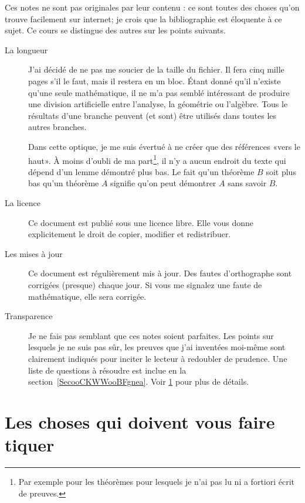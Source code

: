 Ces notes ne sont pas originales par leur contenu : ce sont toutes des choses qu'on trouve facilement sur internet; je crois que la bibliographie est éloquente à ce sujet. Ce cours se distingue des autres sur les points suivants.
\begin{description}
    \item[La longueur] J'ai décidé de ne pas me soucier de la taille du fichier. Il fera cinq mille pages s'il le faut, mais il restera en un bloc. Étant donné qu'il n'existe qu'une seule mathématique, il ne m'a pas semblé intéressant de produire une division artificielle entre l'analyse, la géométrie ou l'algèbre. Tous le résultats d'une branche peuvent (et sont) être utilisés dans toutes les autres branches.

        Dans cette optique, je me suis évertué à ne créer que des références «vers le haut». À moins d'oubli de ma part\footnote{Par exemple pour les théorèmes pour lesquels je n'ai pas lu ni a fortiori écrit de preuves.}, il n'y a aucun endroit du texte qui dépend d'un lemme démontré plus bas. Le fait qu'un théorème \( B\) soit plus bas qu'un théorème \( A\) signifie qu'on peut démontrer \( A\) sans savoir \( B\).

    \item[La licence] Ce document est publié sous une licence libre. Elle vous donne explicitement le droit de copier, modifier et redistribuer.

    \item[Les mises à jour] Ce document est régulièrement mis à jour. Des fautes d'orthographe sont corrigées (presque) chaque jour. Si vous me signalez une faute de mathématique, elle sera corrigée.
    \item[Transparence] Je ne fais pas semblant que ces notes soient parfaites. Les points sur lesquels je ne suis pas sûr, les preuves que j'ai inventées moi-même sont clairement indiqués pour inciter le lecteur à redoubler de prudence. Une liste de questions à résoudre est inclue en la section~\ref{SecooCKWWooBFgnea}. Voir \ref{SECooWVHBooCaYoXP} pour plus de détails.
\end{description}

\section{Les choses qui doivent vous faire tiquer}
\label{SECooWVHBooCaYoXP}

